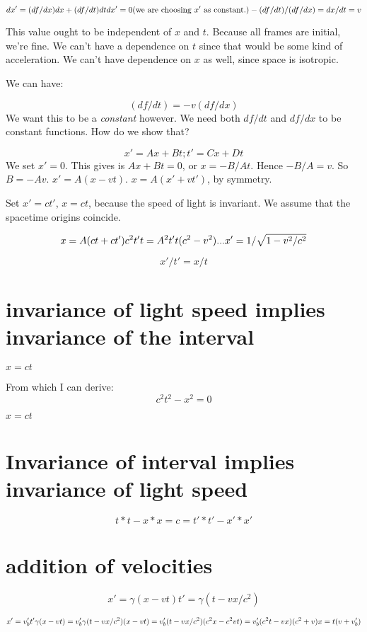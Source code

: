 \documentclass[11pt]{book}
\begin{document}
$$
dx' = (df/dx) dx + (df/dt) dt \\
dx' = 0 \text{(we are choosing $x'$ as constant.)} \\
-(df/dt)/(df/dx) = dx/dt = v \\
$$

This value ought to be independent of $x$ and $t$. Because all frames are
initial, we're fine. We can't have a dependence on $t$ since that would be
some kind of acceleration. We can't have dependence on $x$ as well, since
space is isotropic.

We can have:

$$ (df/dt) = -v (df/dx) $$
We want this to be a \emph{constant} however. We need both $df/dt$ and $df/dx$
to be constant functions. How do we show that?

$$x' = Ax + Bt; t' = Cx + Dt$$ We set $x' = 0$. This gives is $Ax + Bt = 0$,
or $x = -B/At$. Hence $-B/A = v$. So $B = -Av$. $x' = A(x - vt)$.
$x = A(x' + vt')$, by symmetry.

Set $x' = ct'$, $x = ct$, because the speed of light is invariant. We assume
that the spacetime origins coincide.


$$
x = A(ct + ct') \\
c^2 t't = A^2t' t(c^2 - v^2) \\
...
x' = 1/\sqrt{1-v^2/c^2}
$$

$$
x'/t' = x/t
$$

\section{invariance of light speed implies invariance of the interval}
$x = ct$

From which I can derive:
$$c^2t^2 - x^2 = 0$$


$x = ct$

\section{Invariance of interval implies invariance of light speed}
$$
t*t - x*x = c = t'*t' - x'*x'
$$

\section{addition of velocities}

$$
x' = \gamma(x - vt)
t' = \gamma (t - vx/c^2)
$$

$$
x'= v_b' t'
\gamma(x - vt) = v_b' \gamma(t - vx/c^2) 
(x - vt) = v_b' (t - vx/c^2) 
(c^2x - c^2 vt) = v_b' (c^2t - vx) 
(c^2 + v)x = t(v + v_b') \\
$$
\end{document}
